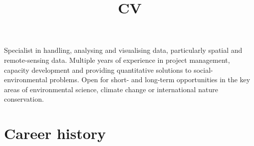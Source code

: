\documentclass[12pt,a4paper,roman]{moderncv}        %
\title{CV}                               %
\begin{document}
\makecvtitle

\small{Specialist in handling, analysing and visualising data, particularly spatial and remote-sensing data. Multiple years of experience in project management, capacity development and providing quantitative solutions to social-environmental problems. Open for short- and long-term opportunities in the key areas of environmental science, climate change or international nature conservation.
}

\section{Career history}
\vspace{4pt}
\end{document}
